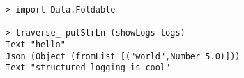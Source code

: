 \begin{repl}\begin{lstlisting}
> import Data.Foldable

> traverse_ putStrLn (showLogs logs)
Text "hello"
Json (Object (fromList [("world",Number 5.0)]))
Text "structured logging is cool"\end{lstlisting}\end{repl}
